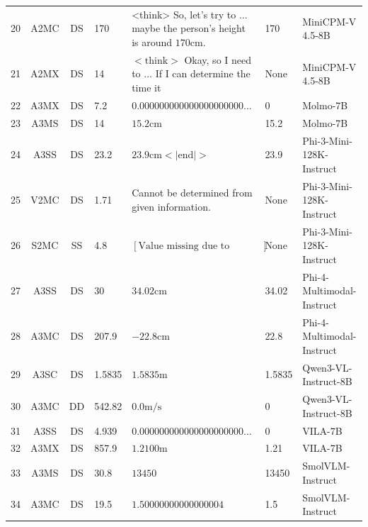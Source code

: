 \begin{tabular}{@{} c c c C{2.0cm} L{5.0cm} C{1.4cm} L{3.2cm} @{}}
20 & A2MC & DS & 170 & <think>
So, let's try to $\dots$ maybe the person's height is around $170 \text{cm}$. & 170 & MiniCPM-V 4.5-8B \\
21 & A2MX & DS & 14 & $<\text{think}>$ Okay, so I need to $\dots$ If I can determine the time it & None & MiniCPM-V 4.5-8B \\
22 & A3MX & DS & 7.2 & $0.000000000000000000000\dots$ & 0 & Molmo-7B \\
23 & A3MS & DS & 14 & $15.2 \text{cm}$ & 15.2 & Molmo-7B \\
24 & A3SS & DS & 23.2 & $23.9 \text{cm}<|\text{end}|>$ & 23.9 & Phi-3-Mini-128K-Instruct \\
25 & V2MC & DS & 1.71 & Cannot be determined from given information. & None & Phi-3-Mini-128K-Instruct \\
26 & S2MC & SS & 4.8 & $[\text{Value missing due to insufficient information}]$ & None & Phi-3-Mini-128K-Instruct \\
27 & A3SS & DS & 30 & $34.02 \text{cm}$ & 34.02 & Phi-4-Multimodal-Instruct \\
28 & A3MC & DS & 207.9 & $-22.8 \text{cm}$ & 22.8 & Phi-4-Multimodal-Instruct \\
29 & A3SC & DS & 1.5835 & $1.5835 \text{m}$ & 1.5835 & Qwen3-VL-Instruct-8B \\
30 & A3MC & DD & 542.82 & $0.0 \text{m/s}$ & 0 & Qwen3-VL-Instruct-8B \\
31 & A3SS & DS & 4.939 & $0.000000000000000000000\dots$ & 0 & VILA-7B \\
32 & A3MX & DS & 857.9 & $1.2100 \text{m}$ & 1.21 & VILA-7B \\
33 & A3MS & DS & 30.8 & $13450$ & 13450 & SmolVLM-Instruct \\
34 & A3MC & DS & 19.5 & $1.50000000000000004$ & 1.5 & SmolVLM-Instruct \\
\bottomrule
\end{tabular}